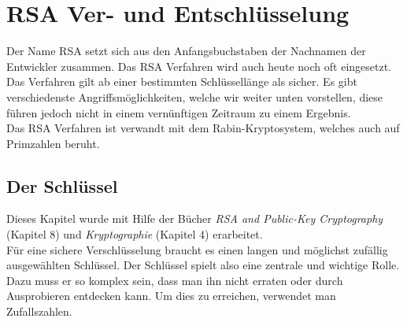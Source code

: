 \newpage
\section{RSA Ver- und Entschlüsselung}
Der Name RSA setzt sich aus den Anfangsbuchstaben der Nachnamen der Entwickler zusammen. Das RSA Verfahren wird auch heute noch oft eingesetzt. Das Verfahren gilt ab einer bestimmten Schlüssellänge als sicher. Es gibt verschiedenste Angriffsmöglichkeiten, welche wir weiter unten vorstellen, diese führen jedoch nicht in einem vernünftigen Zeitraum zu einem Ergebnis. \\
Das RSA Verfahren ist verwandt mit dem Rabin-Kryptosystem, welches auch auf Primzahlen beruht. %

\subsection{Der Schlüssel}
Dieses Kapitel wurde mit Hilfe der Bücher \textit{RSA and Public-Key Cryptography}\cite{rsa_and_public_key} (Kapitel 8) und \textit{Kryptographie}\cite{kryptographie} (Kapitel 4) erarbeitet.\\[2ex]
%
Für eine sichere Verschlüsselung braucht es einen langen und möglichst zufällig ausgewählten Schlüssel. Der Schlüssel spielt also eine zentrale und wichtige Rolle. Dazu muss er so komplex sein, dass man ihn nicht erraten oder durch Ausprobieren entdecken kann. Um dies zu erreichen, verwendet man Zufallszahlen.
%
